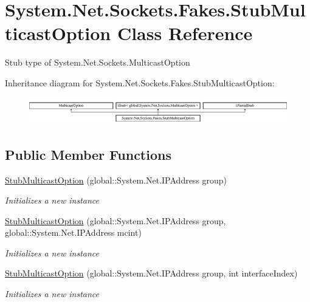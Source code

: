 \hypertarget{class_system_1_1_net_1_1_sockets_1_1_fakes_1_1_stub_multicast_option}{\section{System.\-Net.\-Sockets.\-Fakes.\-Stub\-Multicast\-Option Class Reference}
\label{class_system_1_1_net_1_1_sockets_1_1_fakes_1_1_stub_multicast_option}
}


Stub type of System.\-Net.\-Sockets.\-Multicast\-Option 


Inheritance diagram for System.\-Net.\-Sockets.\-Fakes.\-Stub\-Multicast\-Option\-:\begin{figure}[H]
\begin{center}
\leavevmode
\includegraphics[height=1.196581cm]{class_system_1_1_net_1_1_sockets_1_1_fakes_1_1_stub_multicast_option}
\end{center}
\end{figure}
\subsection*{Public Member Functions}
\begin{DoxyCompactItemize}
\item 
\hyperlink{class_system_1_1_net_1_1_sockets_1_1_fakes_1_1_stub_multicast_option_a49859200c60f75c19666c7fb59128136}{Stub\-Multicast\-Option} (global\-::\-System.\-Net.\-I\-P\-Address group)
\begin{DoxyCompactList}\small\item\em Initializes a new instance\end{DoxyCompactList}\item 
\hyperlink{class_system_1_1_net_1_1_sockets_1_1_fakes_1_1_stub_multicast_option_a17614c0f69115a54fbaeee4437eb9572}{Stub\-Multicast\-Option} (global\-::\-System.\-Net.\-I\-P\-Address group, global\-::\-System.\-Net.\-I\-P\-Address mcint)
\begin{DoxyCompactList}\small\item\em Initializes a new instance\end{DoxyCompactList}\item 
\hyperlink{class_system_1_1_net_1_1_sockets_1_1_fakes_1_1_stub_multicast_option_a62bcb1c89b0db4e898fa5905dcda3bc7}{Stub\-Multicast\-Option} (global\-::\-System.\-Net.\-I\-P\-Address group, int interface\-Index)
\begin{DoxyCompactList}\small\item\em Initializes a new instance\end{DoxyCompactList}\end{DoxyCompactItemize}
